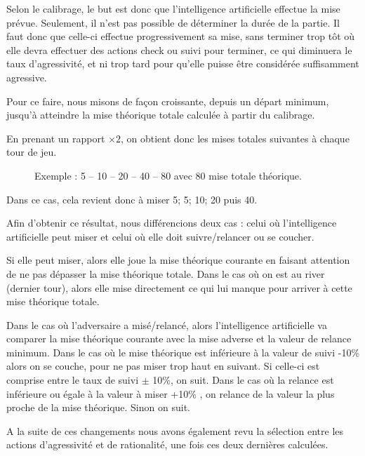 \documentclass{report}
\begin{document}
Selon le calibrage, le but est donc que l'intelligence artificielle effectue la mise prévue. Seulement, il n'est pas possible de déterminer la durée de la partie. Il faut donc que celle-ci effectue progressivement sa mise, sans terminer trop tôt où elle devra effectuer des actions check ou suivi pour terminer, ce qui diminuera le taux d'agressivité, et ni trop tard pour qu'elle puisse être considérée suffisamment agressive.\par
Pour ce faire, nous misons de façon croissante, depuis un départ minimum, jusqu'à atteindre la mise théorique totale calculée à partir du calibrage.\par
En prenant un rapport $\times2$, on obtient donc les mises totales suivantes à chaque tour de jeu.\par

\begin{figure}[H]
\begin{center}
Exemple : 	5 – 10 – 20 – 40 – 80 		avec 80 mise totale théorique.
\end{center}
\end{figure}
Dans ce cas, cela revient donc à miser 5; 5; 10; 20 puis 40.

Afin d'obtenir ce résultat, nous différencions deux cas : celui où l'intelligence artificielle peut miser et celui où elle doit suivre/relancer ou se coucher.\par
Si elle peut miser, alors elle joue la mise théorique courante en faisant attention de ne pas dépasser la mise théorique totale. Dans le cas où on est au river (dernier tour), alors elle mise directement ce qui lui manque pour arriver à cette mise théorique totale.\par

Dans le cas où l'adversaire a misé/relancé, alors l'intelligence artificielle va comparer la mise théorique courante avec la mise adverse et la valeur de relance minimum. Dans le cas où le mise théorique est inférieure à la valeur de suivi -10\% alors on se couche, pour ne  pas miser trop haut en suivant. Si celle-ci est comprise entre le taux de suivi $\pm$ 10\%, on suit.
Dans le cas où la relance est inférieure ou égale à la valeur à miser +10\% , on relance de la valeur la plus proche de la mise théorique. Sinon on suit.\par


A la suite de ces changements nous avons également revu la sélection entre les actions d'agressivité et de rationalité, une fois ces deux dernières calculées.\par
\end{document}
